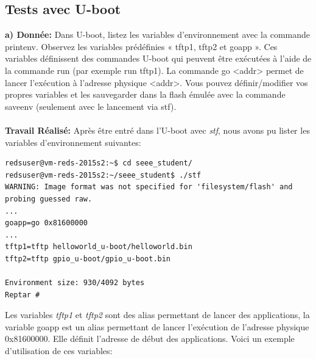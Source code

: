 \subsection{Tests avec U-boot}
\textbf{a) Donnée: }Dans U-boot, listez les variables d'environnement avec la commande printenv. Observez les
variables prédéfinies « tftp1, tftp2 et goapp ». Ces variables définissent des commandes U-boot qui
peuvent être exécutées à l'aide de la commande run (par exemple run tftp1).
La commande go <addr> permet de lancer l'exécution à l'adresse physique <addr>.
Vous pouvez définir/modifier vos propres variables et les sauvegarder dans la flash émulée avec la
commande saveenv (seulement avec le lancement via stf). \\\\
\textbf{Travail Réalisé: }Après être entré dans l'U-boot avec \textit{stf}, nous avons pu lister les variables d'environnement suivantes:
\begin{lstlisting}
redsuser@vm-reds-2015s2:~$ cd seee_student/
redsuser@vm-reds-2015s2:~/seee_student$ ./stf
WARNING: Image format was not specified for 'filesystem/flash' and probing guessed raw.
...
goapp=go 0x81600000
...
tftp1=tftp helloworld_u-boot/helloworld.bin
tftp2=tftp gpio_u-boot/gpio_u-boot.bin

Environment size: 930/4092 bytes
Reptar # 
\end{lstlisting}
Les variables \textit{tftp1} et \textit{tftp2} sont des alias permettant de lancer des applications, la variable goapp est un alias permettant de lancer l'exécution de l'adresse physique 0x81600000. Elle définit l'adresse de début des applications. Voici un exemple d'utilisation de ces variables:
